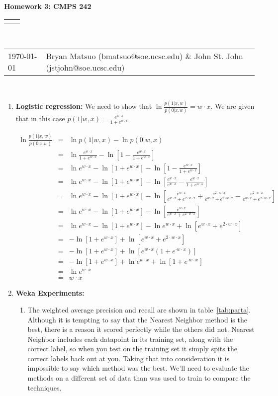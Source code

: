 \documentclass[12pt]{article}
\renewcommand{\title}[1]{\textbf{#1}\\}
\renewcommand{\line}{\begin{tabularx}{\textwidth}{X>{\raggedleft}X}\hline\\\end{tabularx}\\[-0.5cm]}
\newcommand{\leftright}[2]{\begin{tabularx}{\textwidth}{X>{\raggedleft}X}#1%
& #2\\\end{tabularx}\\[-0.5cm]}
\begin{document}
\title{Homework 3: CMPS 242}
\line
\leftright{\today}{Bryan Matsuo (bmatsuo@soe.ucsc.edu) \& John St. John (jstjohn@soe.ucsc.edu)} %
\begin{enumerate}
\item \textbf{Logistic regression:}
We need to show that $\ln \frac{p(1|x,w)}{p(0|x.w)}=w\cdot x$. We are given that in this case $p(1|w,x) = \frac{e^{w\cdot x}}{1+e^{w \cdot x}}$

\begin{eqnarray*}
\ln \frac{p(1|x,w)}{p(0|x.w)}
&=& \ln p(1|w,x) - \ln p(0|w,x) \\
&=&  \ln \frac{e^{w\cdot x}}{1+e^{w \cdot x}} - \ln \left[ 1-\frac{e^{w\cdot x}}{1+e^{w \cdot x}}\right] \\
&=&\ln e^{w\cdot x} - \ln \left[ 1 + e^{w\cdot x} \right] -\ln \left[ 1-\frac{e^{w\cdot x}}{1+e^{w \cdot x}}\right] \\
&=&\ln e^{w\cdot x} - \ln \left[ 1 + e^{w\cdot x} \right] -\ln \left[ \frac{e^{w\cdot x}}{e^{w\cdot x}}-\frac{e^{w\cdot x}}{1+e^{w \cdot x}}\right] \\
&=&\ln e^{w\cdot x} - \ln \left[ 1 + e^{w\cdot x} \right] -\ln \left[ \frac{e^{w\cdot x}}{e^{w\cdot x}+e^{2\cdot w\cdot x}}+ \frac{e^{2\cdot w\cdot x}}{e^{w\cdot x}+e^{2\cdot w\cdot x}}-\frac{e^{2\cdot w\cdot x}}{e^{w\cdot x}+e^{2\cdot w\cdot x}}\right] \\
&=&\ln e^{w\cdot x} - \ln \left[ 1 + e^{w\cdot x} \right] -\ln \left[ \frac{e^{w\cdot x}}{e^{w\cdot x}+e^{2\cdot w\cdot x}}\right] \\
&=&\ln e^{w\cdot x} - \ln \left[ 1 + e^{w\cdot x} \right] -\ln e^{w\cdot x} + \ln \left[ e^{w\cdot x}+e^{2\cdot w\cdot x} \right] \\
&=& - \ln \left[ 1 + e^{w\cdot x} \right] +  \ln \left[ e^{w\cdot x}+e^{2\cdot w\cdot x} \right] \\
&=& - \ln \left[ 1 + e^{w\cdot x} \right] + \ln \left[ e^{w\cdot x}\left(1+e^{\cdot w\cdot x}\right) \right]\\
&=& - \ln \left[ 1 + e^{w\cdot x} \right] + \ln e^{w\cdot x} + \ln \left[1+e^{\cdot w\cdot x}\right] \\
&=&\ln e^{w\cdot x}\\
&=& w\cdot x
\end{eqnarray*}


\item \textbf{Weka Experiments: }
\begin{enumerate}
\item %
The weighted average precision and recall are shown in table~\ref{tab:parta}. Although it is tempting to say that the Nearest Neighbor method is the best, there is a reason it scored perfectly while the others did not. Nearest Neighbor includes each datapoint in its training set, along with the correct label, so when you test on the training set it simply spits the correct labels back out at you. Taking that into consideration it is impossible to say which method was the best. We'll need to evaluate the methods on a different set of data than was used to train to compare the techniques.



\end{enumerate}
\end{enumerate}
\end{document}
